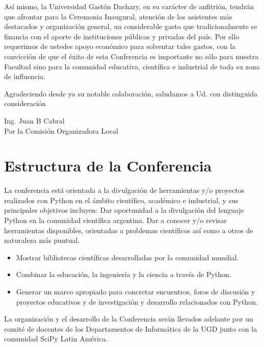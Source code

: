 \documentclass[11pt,a4paper]{report}
\begin{document}
Así mismo, la Universidad Gastón Dachary,  en su carácter de
anfitrión, tendrán que afrontar para la Ceremonia Inaugural, atención
de los asistentes más destacados y organización general, un
considerable gasto que tradicionalmente se financia con el aporte de
instituciones públicas y privadas del país. Por ello requerimos de
ustedes apoyo económico para solventar tales gastos, con la convicción
de que el éxito de esta Conferencia es importante no sólo para nuestra
Facultad sino para la comunidad educativa, científica e industrial de
toda su zona de influencia.

Agradeciendo desde ya su notable colaboración, saludamos a Ud.
con distinguida consideración\\[0.5cm]



\begin{flushright}
Ing. Juan B Cabral\\
Por la Comisión Organizadora Local \\

\end{flushright}
\newpage
\section*{Estructura de la Conferencia}

    La conferencia está orientada a la divulgación de herramientas y/o
    proyectos realizados con Python en el ámbito científico, académico e
    industrial, y sus principales objetivos incluyen: Dar oportunidad a la
    divulgación del lenguaje Python en la comunidad científica argentina.
    Dar a conocer y/o revisar herramientas disponibles, orientadas a problemas
    científicos así como a otros de naturaleza más puntual.
  \begin{itemize}
    \item Mostrar bibliotecas científicas desarrolladas por la comunidad mundial.
    \item Combinar la educación, la ingeniería y la ciencia a través de Python.
    \item Generar un marco apropiado para concretar encuentros, foros de discusión y proyectos educativos y de investigación y desarrollo relacionados con Python.
  \end{itemize}
La organización y el desarrollo de la Conferencia serán llevados adelante
por un comité de docentes de los Departamentos de Informática de la UGD junto
con la comunidad SciPy Latin América.
\end{document}
